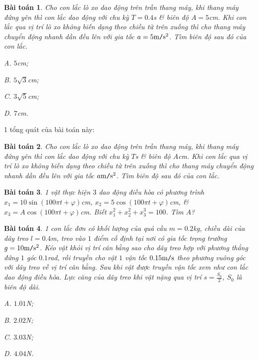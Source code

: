 \documentclass{article}
\numberwithin{equation}{section}
\newtheorem{baitoan}{Bài toán}[section]
\begin{document}
\begin{baitoan}
	Cho con lắc lò xo dao động trên trần thang máy, khi thang máy đứng yên thì con lắc dao động với chu kỳ $T = 0.4$s \& biên độ $A = 5$cm. Khi con lắc qua vị trí lò xo không biến dạng theo chiều từ trên xuống thì cho thang máy chuyển động nhanh dần đều lên với gia tốc $a = 5{\rm m\texttt{/}s^2}$. Tìm biên độ sau đó của con lắc.
	\begin{enumerate*}
		\item[{\rm\sf A.}] $5$cm;
		\item[{\rm\sf B.}] $5\sqrt{3}$cm; 
		\item[{\rm\sf C.}] $3\sqrt{5}$cm;
		\item[{\rm\sf D.}] $7$cm.
	\end{enumerate*}
\end{baitoan}
1 tổng quát của bài toán này:
\begin{baitoan}
	Cho con lắc lò xo dao động trên trần thang máy, khi thang máy đứng yên thì con lắc dao động với chu kỳ $T$s \& biên độ $A$cm. Khi con lắc qua vị trí lò xo không biến dạng theo chiều từ trên xuống thì cho thang máy chuyển động nhanh dần đều lên với gia tốc $a{\rm m\texttt{/}s^2}$. Tìm biên độ sau đó của con lắc. 
\end{baitoan}

\begin{baitoan}
	1 vật thực hiện $3$ dao động điều hòa có phương trình $x_1 = 10\sin(100\pi t + \varphi)$cm, $x_2 = 5\cos(100\pi t + \varphi)$cm, \& $x_3 = A\cos(100\pi t + \varphi)$cm. Biết $x_1^2 + x_2^2 + x_3^3 = 100$. Tìm $A$?
\end{baitoan}

\begin{baitoan}
	1 con lắc đơn có khối lượng của quả cầu $m = 0.2$kg, chiều dài của dây treo $l = 0.4$m, treo vào $1$ điểm cố định tại nơi có gia tốc trọng trường $g = 10{\rm m\texttt{/}s^2}$. Kéo vật khỏi vị trí cân bằng sao cho dây treo hợp với phương thẳng đứng $1$ góc $0.1$rad, rồi truyền cho vật $1$ vận tốc $0.15{\rm m\texttt{/}s}$ theo phương vuông góc với dây treo về vị trí cân bằng. Sau khi vật được truyền vận tốc xem như con lắc dao động điều hòa. Lực căng của dây treo khi vật nặng qua vị trí $s = \frac{S_0}{2}$, $S_0$ là biên độ dài.
	\begin{enumerate*}
		\item[{\rm\sf A.}] $1.01$N;
		\item[{\rm\sf B.}] $2.02$N; 
		\item[{\rm\sf C.}] $3.03$N;
		\item[{\rm\sf D.}] $4.04$N.
	\end{enumerate*}
\end{baitoan}
\end{document}
